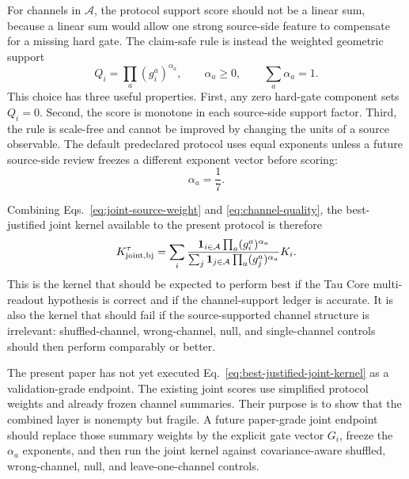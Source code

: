 \documentclass[11pt]{article}
\begin{document}
For channels in \(\mathcal A\), the protocol support score should not be a
linear sum, because a linear sum would allow one strong source-side feature to
compensate for a missing hard gate.  The claim-safe rule is instead the
weighted geometric support
\begin{equation}
Q_i
=
\prod_a (g_i^a)^{\alpha_a},
\qquad
\alpha_a\ge0,\qquad \sum_a\alpha_a=1.
\label{eq:channel-quality}
\end{equation}
This choice has three useful properties.  First, any zero hard-gate component
sets \(Q_i=0\).  Second, the score is monotone in each source-side support
factor.  Third, the rule is scale-free and cannot be improved by changing the
units of a source observable.  The default predeclared protocol uses equal
exponents unless a future source-side review freezes a different exponent
vector before scoring:
\[
\alpha_a=\frac{1}{7}.
\]

Combining Eqs.~\eqref{eq:joint-source-weight} and
\eqref{eq:channel-quality}, the best-justified joint kernel available to the
present protocol is therefore
\begin{equation}
K_{\rm joint,bj}^{\tau}
=
\sum_{i}
\frac{\mathbf 1_{i\in\mathcal A}
      \prod_a (g_i^a)^{\alpha_a}}
     {\sum_j \mathbf 1_{j\in\mathcal A}
      \prod_a (g_j^a)^{\alpha_a}}
K_i.
\label{eq:best-justified-joint-kernel}
\end{equation}
This is the kernel that should be expected to perform best if the Tau Core
multi-readout hypothesis is correct and if the channel-support ledger is
accurate.  It is also the kernel that should fail if the source-supported
channel structure is irrelevant: shuffled-channel, wrong-channel, null, and
single-channel controls should then perform comparably or better.

The present paper has not yet executed
Eq.~\eqref{eq:best-justified-joint-kernel} as a validation-grade endpoint.  The
existing joint scores use simplified protocol weights and already frozen
channel summaries.  Their purpose is to show that the combined layer is
nonempty but fragile.  A future paper-grade joint endpoint should replace those
summary weights by the explicit gate vector \(G_i\), freeze the \(\alpha_a\)
exponents, and then run the joint kernel against covariance-aware shuffled,
wrong-channel, null, and leave-one-channel controls.
\end{document}
